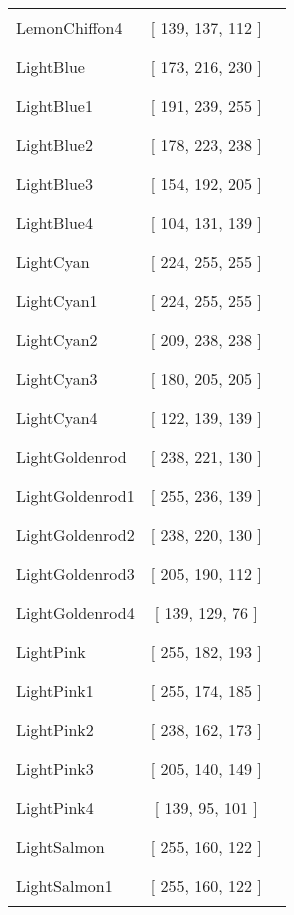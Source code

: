 \begin{tabular}{|l|c|c|}
LemonChiffon4 & [ 139, 137, 112 ] & \color{LemonChiffon4} \rule{1cm}{1.5ex}\\
LightBlue & [ 173, 216, 230 ] & \color{LightBlue} \rule{1cm}{1.5ex}\\
LightBlue1 & [ 191, 239, 255 ] & \color{LightBlue1} \rule{1cm}{1.5ex}\\
LightBlue2 & [ 178, 223, 238 ] & \color{LightBlue2} \rule{1cm}{1.5ex}\\
LightBlue3 & [ 154, 192, 205 ] & \color{LightBlue3} \rule{1cm}{1.5ex}\\
LightBlue4 & [ 104, 131, 139 ] & \color{LightBlue4} \rule{1cm}{1.5ex}\\
LightCyan & [ 224, 255, 255 ] & \color{LightCyan} \rule{1cm}{1.5ex}\\
LightCyan1 & [ 224, 255, 255 ] & \color{LightCyan1} \rule{1cm}{1.5ex}\\
LightCyan2 & [ 209, 238, 238 ] & \color{LightCyan2} \rule{1cm}{1.5ex}\\
LightCyan3 & [ 180, 205, 205 ] & \color{LightCyan3} \rule{1cm}{1.5ex}\\
LightCyan4 & [ 122, 139, 139 ] & \color{LightCyan4} \rule{1cm}{1.5ex}\\
LightGoldenrod & [ 238, 221, 130 ] & \color{LightGoldenrod} \rule{1cm}{1.5ex}\\
LightGoldenrod1 & [ 255, 236, 139 ] & \color{LightGoldenrod1} \rule{1cm}{1.5ex}\\
LightGoldenrod2 & [ 238, 220, 130 ] & \color{LightGoldenrod2} \rule{1cm}{1.5ex}\\
LightGoldenrod3 & [ 205, 190, 112 ] & \color{LightGoldenrod3} \rule{1cm}{1.5ex}\\
LightGoldenrod4 & [ 139, 129, 76 ] & \color{LightGoldenrod4} \rule{1cm}{1.5ex}\\
LightPink & [ 255, 182, 193 ] & \color{LightPink} \rule{1cm}{1.5ex}\\
LightPink1 & [ 255, 174, 185 ] & \color{LightPink1} \rule{1cm}{1.5ex}\\
LightPink2 & [ 238, 162, 173 ] & \color{LightPink2} \rule{1cm}{1.5ex}\\
LightPink3 & [ 205, 140, 149 ] & \color{LightPink3} \rule{1cm}{1.5ex}\\
LightPink4 & [ 139, 95, 101 ] & \color{LightPink4} \rule{1cm}{1.5ex}\\
LightSalmon & [ 255, 160, 122 ] & \color{LightSalmon} \rule{1cm}{1.5ex}\\
LightSalmon1 & [ 255, 160, 122 ] & \color{LightSalmon1} \rule{1cm}{1.5ex}\\

\end{tabular}
